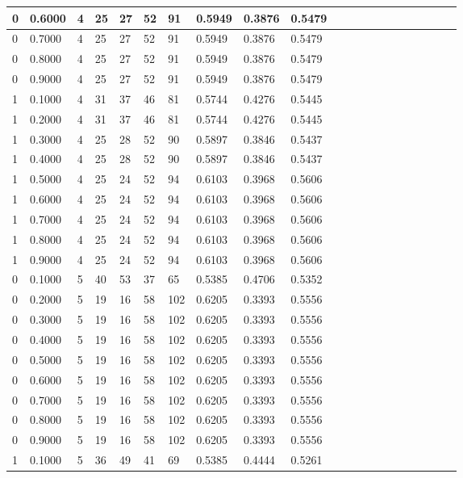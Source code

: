 \documentclass[12pt]{article}
\begin{document}
\begin{flushleft}
{\begin{tabular}{| l | l | l | l | l | l | l | l | l | l | l | l | l | l | l | l | l | l | l | l | l |}
				0 & 0.6000 & 4 & 25 & 27 & 52 & 91 & 0.5949 & 0.3876 & 0.5479\\ \hline
				0 & 0.7000 & 4 & 25 & 27 & 52 & 91 & 0.5949 & 0.3876 & 0.5479\\ \hline
				0 & 0.8000 & 4 & 25 & 27 & 52 & 91 & 0.5949 & 0.3876 & 0.5479\\ \hline
				0 & 0.9000 & 4 & 25 & 27 & 52 & 91 & 0.5949 & 0.3876 & 0.5479\\ \hline
				1 & 0.1000 & 4 & 31 & 37 & 46 & 81 & 0.5744 & 0.4276 & 0.5445\\ \hline
				1 & 0.2000 & 4 & 31 & 37 & 46 & 81 & 0.5744 & 0.4276 & 0.5445\\ \hline
				1 & 0.3000 & 4 & 25 & 28 & 52 & 90 & 0.5897 & 0.3846 & 0.5437\\ \hline
				1 & 0.4000 & 4 & 25 & 28 & 52 & 90 & 0.5897 & 0.3846 & 0.5437\\ \hline
				1 & 0.5000 & 4 & 25 & 24 & 52 & 94 & 0.6103 & 0.3968 & 0.5606\\ \hline
				1 & 0.6000 & 4 & 25 & 24 & 52 & 94 & 0.6103 & 0.3968 & 0.5606\\ \hline
				1 & 0.7000 & 4 & 25 & 24 & 52 & 94 & 0.6103 & 0.3968 & 0.5606\\ \hline
				1 & 0.8000 & 4 & 25 & 24 & 52 & 94 & 0.6103 & 0.3968 & 0.5606\\ \hline
				1 & 0.9000 & 4 & 25 & 24 & 52 & 94 & 0.6103 & 0.3968 & 0.5606\\ \hline
				0 & 0.1000 & 5 & 40 & 53 & 37 & 65 & 0.5385 & 0.4706 & 0.5352\\ \hline
				0 & 0.2000 & 5 & 19 & 16 & 58 & 102 & 0.6205 & 0.3393 & 0.5556\\ \hline
				0 & 0.3000 & 5 & 19 & 16 & 58 & 102 & 0.6205 & 0.3393 & 0.5556\\ \hline
				0 & 0.4000 & 5 & 19 & 16 & 58 & 102 & 0.6205 & 0.3393 & 0.5556\\ \hline
				0 & 0.5000 & 5 & 19 & 16 & 58 & 102 & 0.6205 & 0.3393 & 0.5556\\ \hline
				0 & 0.6000 & 5 & 19 & 16 & 58 & 102 & 0.6205 & 0.3393 & 0.5556\\ \hline
				0 & 0.7000 & 5 & 19 & 16 & 58 & 102 & 0.6205 & 0.3393 & 0.5556\\ \hline
				0 & 0.8000 & 5 & 19 & 16 & 58 & 102 & 0.6205 & 0.3393 & 0.5556\\ \hline
				0 & 0.9000 & 5 & 19 & 16 & 58 & 102 & 0.6205 & 0.3393 & 0.5556\\ \hline
				1 & 0.1000 & 5 & 36 & 49 & 41 & 69 & 0.5385 & 0.4444 & 0.5261\\ \hline

\end{tabular}}
\end{flushleft}
\end{document}
